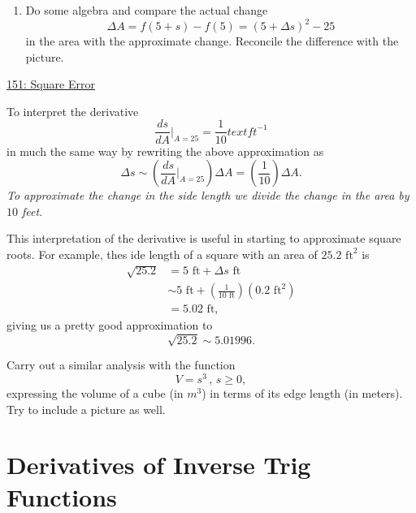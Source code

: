 \documentclass{ximera}
\begin{document}
\begin{example}
\begin{enumerate}
\item Do some algebra and compare the actual change 
\[
    \Delta A = f(5+s) - f(5) = (5+\Delta s)^2 - 25
\]
in the area with the approximate change. Reconcile the difference with the picture.

\end{enumerate}
\begin{freeResponse}
\end{freeResponse}

\begin{onlineOnly}
    \begin{center}
\end{center}
\end{onlineOnly}


\href{https://www.desmos.com/calculator/h2fm6mm8ua}{151: Square Error}


To interpret the derivative 
\[
    \frac{ds}{dA}\Big|_{A=25} = \frac{1}{10} text{ ft}^{-1}
\]
in much the same way by rewriting the above approximation as
\[
    \Delta s \sim \left( \frac{ds}{dA}\Big|_{A=25}\right)\Delta A = \left(\frac{1}{10}\right) \Delta A.
\]
\emph{To approximate the change in the side length we divide the change in the area by $10$ feet}.

This interpretation of the derivative is useful in starting to approximate square roots. For example,  thes ide length of a square with an area of $25.2 \text{ ft}^2$ is 
\begin{align*}
              \sqrt{25.2} &=      5 \text{ ft} + \Delta s  \text{ ft}  \\
                               & \sim 5 \text{ ft} +   \left(\frac{1}{10 \text{ ft}}\right)(0.2 \text{ ft}^2) \\
                                      &= 5.02 \text{ ft},
\end{align*}
giving us a pretty good approximation to 
\[
    \sqrt{25.2} \sim 5.01996 .
\]
\end{example}


\begin{exercise}  \label{ExLDFDFDdare}
Carry out a similar analysis with the function
\[
    V = s^3 \, , \, s\geq 0,
\]
expressing the volume of a cube (in $m^3$) in terms of its edge length (in meters). Try to include a picture as well.
\end{exercise}



\section{Derivatives of Inverse Trig Functions}
\end{document}
